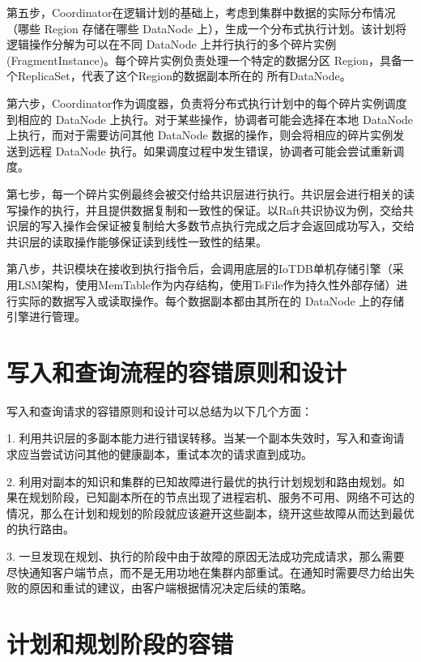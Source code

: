第五步，Coordinator在逻辑计划的基础上，考虑到集群中数据的实际分布情况（哪些 Region 存储在哪些 DataNode 上），生成一个分布式执行计划。该计划将逻辑操作分解为可以在不同 DataNode 上并行执行的多个碎片实例 (FragmentInstance)。每个碎片实例负责处理一个特定的数据分区 Region，具备一个ReplicaSet，代表了这个Region的数据副本所在的 所有DataNode。

第六步，Coordinator作为调度器，负责将分布式执行计划中的每个碎片实例调度到相应的 DataNode 上执行。对于某些操作，协调者可能会选择在本地 DataNode 上执行，而对于需要访问其他 DataNode 数据的操作，则会将相应的碎片实例发送到远程 DataNode 执行。如果调度过程中发生错误，协调者可能会尝试重新调度。

第七步，每一个碎片实例最终会被交付给共识层进行执行。共识层会进行相关的读写操作的执行，并且提供数据复制和一致性的保证。以Raft共识协议为例，交给共识层的写入操作会保证被复制给大多数节点执行完成之后才会返回成功写入，交给共识层的读取操作能够保证读到线性一致性的结果。

第八步，共识模块在接收到执行指令后，会调用底层的IoTDB单机存储引擎（采用LSM架构，使用MemTable作为内存结构，使用TsFile\cite{zhao2024apachetsfile}作为持久性外部存储）进行实际的数据写入或读取操作。每个数据副本都由其所在的 DataNode 上的存储引擎进行管理。


\section{写入和查询流程的容错原则和设计}

写入和查询请求的容错原则和设计可以总结为以下几个方面：

1. 利用共识层的多副本能力进行错误转移。当某一个副本失效时，写入和查询请求应当尝试访问其他的健康副本，重试本次的请求直到成功。

2. 利用对副本的知识和集群的已知故障进行最优的执行计划规划和路由规划。如果在规划阶段，已知副本所在的节点出现了进程宕机、服务不可用、网络不可达的情况，那么在计划和规划的阶段就应该避开这些副本，绕开这些故障从而达到最优的执行路由。

3. 一旦发现在规划、执行的阶段中由于故障的原因无法成功完成请求，那么需要尽快通知客户端节点，而不是无用功地在集群内部重试。在通知时需要尽力给出失败的原因和重试的建议，由客户端根据情况决定后续的策略。


\section{计划和规划阶段的容错}

\subsection{}


